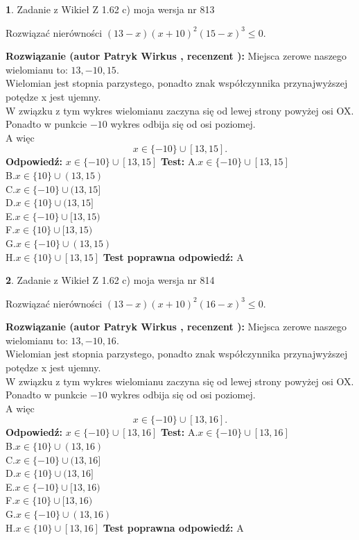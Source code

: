 \documentclass[12pt, a4paper]{article}
\theoremstyle{definition} %
\newtheorem{zad}{}
\newcommand{\zadStart}[1]{\begin{zad}#1\newline}
\newcommand{\zadStop}{\end{zad}}
\newcommand{\rozwStart}[2]{\noindent \textbf{Rozwiązanie (autor #1 , recenzent #2): }\newline}
\newcommand{\rozwStop}{\newline}
\newcommand{\odpStart}{\noindent \textbf{Odpowiedź:}\newline}
\newcommand{\odpStop}{\newline}
\newcommand{\testStart}{\noindent \textbf{Test:}\newline}
\newcommand{\testStop}{\newline}
\newcommand{\kluczStart}{\noindent \textbf{Test poprawna odpowiedź:}\newline}
\newcommand{\kluczStop}{\newline}
\begin{document}
\zadStart{Zadanie z Wikieł Z 1.62 c) moja wersja nr 813}

Rozwiązać nierówności $(13-x)(x+10)^{2}(15-x)^{3}\le0$.
\zadStop
\rozwStart{Patryk Wirkus}{}
Miejsca zerowe naszego wielomianu to: $13, -10, 15$.\\
Wielomian jest stopnia parzystego, ponadto znak współczynnika przy\linebreak najwyższej potędze x jest ujemny.\\ W związku z tym wykres wielomianu zaczyna się od lewej strony powyżej osi OX.\\
Ponadto w punkcie $-10$ wykres odbija się od osi poziomej.\\
A więc $$x \in \{-10\} \cup [13,15].$$
\rozwStop
\odpStart
$x \in \{-10\} \cup [13,15]$
\odpStop
\testStart
A.$x \in \{-10\} \cup [13,15]$\\
B.$x \in \{10\} \cup (13,15)$\\
C.$x \in \{-10\} \cup (13,15]$\\
D.$x \in \{10\} \cup (13,15]$\\
E.$x \in \{-10\} \cup [13,15)$\\
F.$x \in \{10\} \cup [13,15)$\\
G.$x \in \{-10\} \cup (13,15)$\\
H.$x \in \{10\} \cup [13,15]$
\testStop
\kluczStart
A
\kluczStop



\zadStart{Zadanie z Wikieł Z 1.62 c) moja wersja nr 814}

Rozwiązać nierówności $(13-x)(x+10)^{2}(16-x)^{3}\le0$.
\zadStop
\rozwStart{Patryk Wirkus}{}
Miejsca zerowe naszego wielomianu to: $13, -10, 16$.\\
Wielomian jest stopnia parzystego, ponadto znak współczynnika przy\linebreak najwyższej potędze x jest ujemny.\\ W związku z tym wykres wielomianu zaczyna się od lewej strony powyżej osi OX.\\
Ponadto w punkcie $-10$ wykres odbija się od osi poziomej.\\
A więc $$x \in \{-10\} \cup [13,16].$$
\rozwStop
\odpStart
$x \in \{-10\} \cup [13,16]$
\odpStop
\testStart
A.$x \in \{-10\} \cup [13,16]$\\
B.$x \in \{10\} \cup (13,16)$\\
C.$x \in \{-10\} \cup (13,16]$\\
D.$x \in \{10\} \cup (13,16]$\\
E.$x \in \{-10\} \cup [13,16)$\\
F.$x \in \{10\} \cup [13,16)$\\
G.$x \in \{-10\} \cup (13,16)$\\
H.$x \in \{10\} \cup [13,16]$
\testStop
\kluczStart
A
\kluczStop
\end{document}
